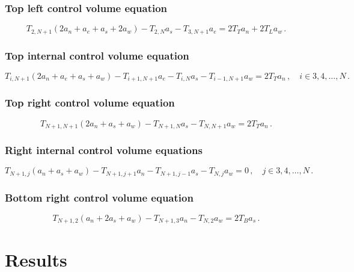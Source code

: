 \documentclass{article}
\begin{document}
\subsubsection*{Top left control volume equation}

\begin{equation}
	T_{2, N+1} (2a_n + a_e + a_s + 2a_w) - T_{2,N} a_s - T_{3,N+1} a_e = 2 T_T a_n + 2 T_L a_w\,.
\end{equation}

\subsubsection*{Top internal control volume equation}

\begin{equation}
	T_{i,N+1} (2a_n + a_e + a_s + a_w) - T_{i+1,N+1}a_e - T_{i, N} a_s - T_{i-1,N+1} a_w = 2 T_T a_n\,, \quad i \in 3, 4, \ldots, N\,.
\end{equation}

\subsubsection*{Top right control volume equation}

\begin{equation}
	T_{N+1, N+1} (2a_n + a_s + a_w) - T_{N+1, N} a_s - T_{N, N+1} a_w = 2 T_T a_n\,.
\end{equation}

\subsubsection*{Right internal control volume equations}

\begin{equation}
	T_{N+1, j} (a_n + a_s + a_w) - T_{N+1, j+1} a_n - T_{N+1, j - 1} a_s - T_{N, j} a_w = 0\,, \quad j \in 3, 4, \ldots, N\,.
\end{equation}

\subsubsection*{Bottom right control volume equation}

\begin{equation}
	T_{N+1, 2} (a_n + 2 a_s + a_w) - T_{N+1, 3} a_n - T_{N, 2} a_w = 2 T_B a_s\,.
\end{equation}

\section*{Results}
\end{document}
